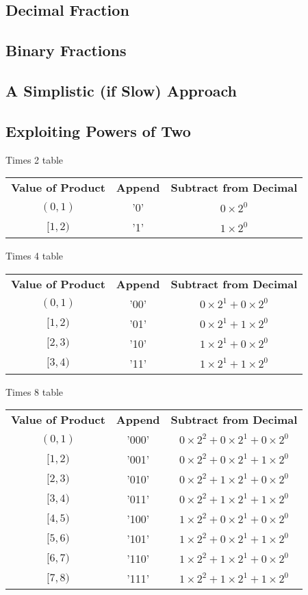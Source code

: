 \documentclass[12pt]{article}
\begin{document}
\subsection{Decimal Fraction}

\subsection{Binary Fractions}

\subsection{A Simplistic (if Slow) Approach}

\subsection{Exploiting Powers of Two}
Times 2 table
\begin{center}
\begin{tabular}{c|c|c}
    \textbf{Value of Product} & \textbf{Append} & \textbf{Subtract from Decimal} \\
    $(0,1)$   & '0' & $0\times2^0$ \\
    $[1,2)$   & '1' & $1\times2^0$
\end{tabular}
\end{center}
Times 4 table
\begin{center}
\begin{tabular}{c|c|c}
    \textbf{Value of Product} & \textbf{Append} & \textbf{Subtract from Decimal} \\
    $(0,1)$   & '00' & $0\times2^1 + 0\times2^0$ \\
    $[1,2)$   & '01' & $0\times2^1 + 1\times2^0$ \\
    $[2,3)$   & '10' & $1\times2^1 + 0\times2^0$ \\
    $[3,4)$   & '11' & $1\times2^1 + 1\times2^0$
\end{tabular}
\end{center}
Times 8 table
\begin{center}
\begin{tabular}{c|c|c}
    \textbf{Value of Product} & \textbf{Append} & \textbf{Subtract from Decimal} \\
    $(0,1)$   & '000' & $0\times2^2 + 0\times2^1 + 0\times2^0$ \\
    $[1,2)$   & '001' & $0\times2^2 + 0\times2^1 + 1\times2^0$ \\
    $[2,3)$   & '010' & $0\times2^2 + 1\times2^1 + 0\times2^0$ \\
    $[3,4)$   & '011' & $0\times2^2 + 1\times2^1 + 1\times2^0$ \\
    $[4,5)$   & '100' & $1\times2^2 + 0\times2^1 + 0\times2^0$ \\
    $[5,6)$   & '101' & $1\times2^2 + 0\times2^1 + 1\times2^0$ \\
    $[6,7)$   & '110' & $1\times2^2 + 1\times2^1 + 0\times2^0$ \\
    $[7,8)$   & '111' & $1\times2^2 + 1\times2^1 + 1\times2^0$
\end{tabular}
\end{center}
\end{document}
